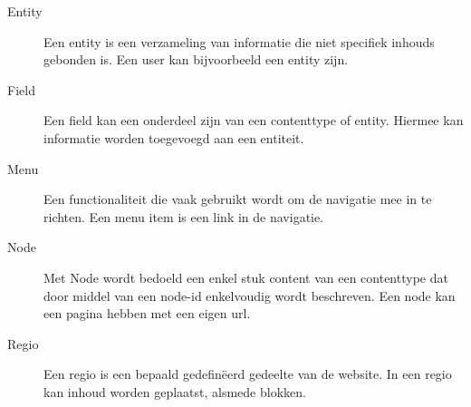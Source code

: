 \begin{description}
\item[Entity] Een entity is een verzameling van informatie die niet specifiek inhouds gebonden is. Een user kan bijvoorbeeld een entity zijn. 

\item[Field] Een field kan een onderdeel zijn van een contenttype of entity. Hiermee kan informatie worden toegevoegd aan een entiteit. 

\item[Menu] Een functionaliteit die vaak gebruikt wordt om de navigatie mee in te richten. Een menu item is een link in de navigatie. 

\item[Node] Met Node wordt bedoeld een enkel stuk content van een contenttype dat door middel van een node-id enkelvoudig wordt beschreven. Een node kan een pagina hebben met een eigen url. 

\item[Regio] Een regio is een bepaald gedefin\"eerd gedeelte van de website. In een regio kan inhoud worden geplaatst, alsmede blokken.

\end{description}